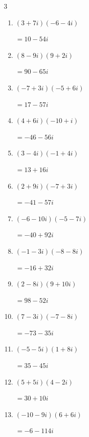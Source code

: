 \begin{multicols}{3}
\begin{enumerate}
  \item $\displaystyle (3+7i)(-6-4i)$

        $\displaystyle =10-54i$

  \item $\displaystyle (8-9i)(9+2i)$

        $\displaystyle =90-65i$

  \item $\displaystyle (-7+3i)(-5+6i)$

        $\displaystyle =17-57i$

  \item $\displaystyle (4+6i)(-10+i)$

        $\displaystyle =-46-56i$

  \item $\displaystyle (3-4i)(-1+4i)$

        $\displaystyle =13+16i$

  \item $\displaystyle (2+9i)(-7+3i)$

        $\displaystyle =-41-57i$

  \item $\displaystyle (-6-10i)(-5-7i)$

        $\displaystyle =-40+92i$

  \item $\displaystyle (-1-3i)(-8-8i)$

        $\displaystyle =-16+32i$

  \item $\displaystyle (2-8i)(9+10i)$

        $\displaystyle =98-52i$

  \item $\displaystyle (7-3i)(-7-8i)$

        $\displaystyle =-73-35i$

  \item $\displaystyle (-5-5i)(1+8i)$

        $\displaystyle =35-45i$

  \item $\displaystyle (5+5i)(4-2i)$

        $\displaystyle =30+10i$

\columnbreak %

\resetques

  \item $\displaystyle (-10-9i)(6+6i)$

        $\displaystyle =-6-114i$


\end{enumerate}
\end{multicols}
